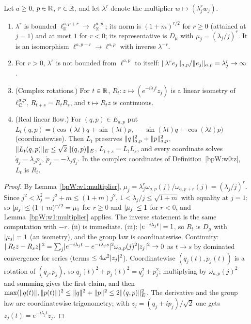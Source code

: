 \begin{lemma}\label{bpW:w1:diag}
Let $a\ge0$, $p\in\mathbb{R}$, $r\in\mathbb{R}$, and let $\lambda^r$ denote the multiplier $w\mapsto(\lambda_j^rw_j)$.
\begin{enumerate}[label=(\roman*)]
\item $\lambda^r$ is bounded $\ell^{a,p+r}_{\mathbb K}\to\ell^{a,p}_{\mathbb K}$; its norm is $(1+m)^{r/2}$ for
  $r\ge0$ (attained at $j=1$) and at most $1$ for $r<0$; its representative is
  $D_\mu$ with $\mu_j=(\lambda_j/j)^r$. It is an isomorphism $\ell^{a,p+r}\to\ell^{a,p}$ with inverse $\lambda^{-r}$.
\item For $r>0$, $\lambda^r$ is not bounded from $\ell^{a,p}$ to itself: $\lVert \lambda^re_j\rVert_{a,p}/\lVert e_j\rVert_{a,p}=\lambda_j^r\to\infty$.
\item (Complex rotations.) For $t\in\mathbb{R}$, $R_t:z\mapsto(e^{-i\lambda_jt}z_j)$ is a linear isometry of
  $\ell^{a,p}_{\mathbb{C}}$, $R_{t+s}=R_tR_s$, and $t\mapsto R_tz$ is continuous.
\item (Real linear flow.) For $(q,p)\in E_{a,p}$ put
  $L_t(q,p)=\bigl(\cos(\lambda t)q+\sin(\lambda t)p,\;-\sin(\lambda t)q+\cos(\lambda t)p\bigr)$ (coordinatewise).
  Then $L_t$ preserves $\lVert q\rVert_{a,p}^2+\lVert p\rVert_{a,p}^2$, $\lVert L_t(q,p)\rVert_E\le\sqrt2\,\lVert (q,p)\rVert_E$, $L_{t+s}=L_tL_s$,
  and every coordinate solves $\dot q_j=\lambda_jp_j$, $\dot p_j=-\lambda_jq_j$. In the complex coordinates of
  Definition~\ref{bpW:w0:z}, $L_t$ is $R_t$.
\end{enumerate}
\end{lemma}

\begin{proof}
\label{stepW:w1:ratio}
By Lemma~\ref{bpW:w1:multiplier}, $\mu_j=\lambda_j^r\omega_{a,p}(j)/\omega_{a,p+r}(j)=(\lambda_j/j)^r$. Since
$j^2<\lambda_j^2=j^2+m\le(1+m)j^2$, $1<\lambda_j/j\le\sqrt{1+m}$ with equality at $j=1$; so
$\lvert \mu_j\rvert\le(1+m)^{r/2}=\mu_1$ for $r\ge0$ and $\lvert \mu_j\rvert\le1$ for $r<0$, and Lemma~\ref{bpW:w1:multiplier} applies. The inverse statement is the same computation with
$-r$.
\label{stepW:w1:rot}
(ii) is immediate. (iii): $\lvert e^{-i\lambda_jt}\rvert=1$, so $R_t$ is $D_\mu$ with $\lvert \mu_j\rvert=1$ (an isometry), and the
group law is coordinatewise. Continuity: $\lVert R_tz-R_sz\rVert^2=\sum_j\lvert e^{-i\lambda_jt}-e^{-i\lambda_js}\rvert^2
\omega_{a,p}(j)^2\lvert z_j\rvert^2\to0$ as $t\to s$ by dominated convergence for series (terms $\le4\omega^2\lvert z_j\rvert^2$).
\label{stepW:w1:realflow}
Coordinatewise $(q_j(t),p_j(t))$ is a rotation of $(q_j,p_j)$, so $q_j(t)^2+p_j(t)^2=q_j^2+p_j^2$; multiplying by
$\omega_{a,p}(j)^2$ and summing gives the first claim, and then $\max(\lVert q(t)\rVert,\lVert p(t)\rVert)^2\le
\lVert q\rVert^2+\lVert p\rVert^2\le2\lVert (q,p)\rVert_E^2$. The derivative and the group law are coordinatewise trigonometry; with
$z_j=(q_j+ip_j)/\sqrt2$ one gets $z_j(t)=e^{-i\lambda_jt}z_j$.
\end{proof}

